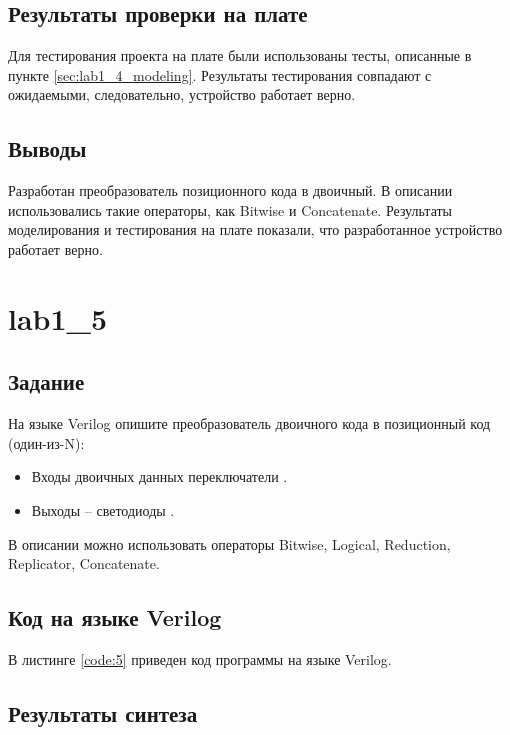 \subsection{Результаты проверки на плате}

Для тестирования проекта на плате были использованы тесты, описанные в пункте \ref{sec:lab1_4_modeling}. Результаты тестирования совпадают с ожидаемыми, следовательно, устройство работает верно.

\subsection{Выводы}

Разработан преобразователь позиционного кода в двоичный. В описании использовались такие операторы, как Bitwise и Concatenate. Результаты моделирования и тестирования на плате показали, что разработанное устройство работает верно.

\newpage

\section{lab1\_5}

\subsection{Задание}

На языке Verilog опишите преобразователь двоичного кода в позиционный код (один-из-N):
\begin{itemize}
	\item Входы двоичных данных переключатели .
	\item Выходы – светодиоды .
\end{itemize}
В описании можно использовать операторы Bitwise, Logical, Reduction, Replicator, Concatenate.

\subsection{Код на языке Verilog}

В листинге \ref{code:5} приведен код программы на языке Verilog.



\subsection{Результаты синтеза}

